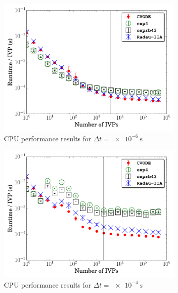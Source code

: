 \documentclass[preprint,review,11pt]{elsarticle}
\begin{document}
\begin{figure}[htbp]
  \centering
  \begin{subfigure}{0.49\textwidth}
      \includegraphics[width=\linewidth]{CH4_1e-06_cpu.pdf}
      \caption{CPU performance results for $\Delta t = \SI{e-6}{\second}$}
      \label{F:ch4_cpu_perf_small}
  \end{subfigure}
  \begin{subfigure}{0.49\textwidth}
      \includegraphics[width=\linewidth]{CH4_1e-04_cpu.pdf}
      \caption{CPU performance results for $\Delta t = \SI{e-4}{\second}$}
      \label{F:ch4_cpu_perf_large}
  \end{subfigure}\\
  \begin{subfigure}{0.49\textwidth}

\end{subfigure}
\end{figure}
\end{document}
